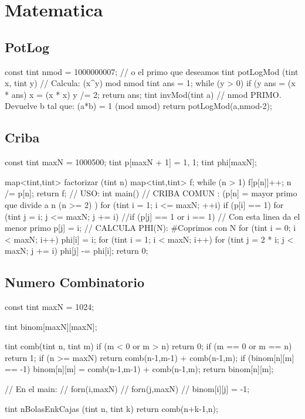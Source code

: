 \section{Matematica}

\subsection{PotLog}
\begin{code}
const tint nmod = 1000000007; // o el primo que deseamos
tint potLogMod (tint x, tint y) // Calcula: (x^y) mod nmod
{
	tint ans = 1;
	while (y > 0)
	{
		if (y %
			ans = (x * ans) %
		x = (x * x) %
		y /= 2;
	}
	return ans;
}
tint invMod(tint a) // nmod PRIMO. Devuelve b tal que: (a*b) = 1 (mod nmod) 
{
	return potLogMod(a,nmod-2);
}
\end{code}

\subsection{Criba}
\begin{code}
const tint maxN = 1000500;
tint p[maxN + 1] = {1, 1};
tint phi[maxN]; 

map<tint,tint> factorizar (tint n)
{
	map<tint,tint> f;
	while (n > 1) 
	{ 
		f[p[n]]++;
		n /= p[n]; 
	}
	return f;
}
// USO:
int main()
{
	// CRIBA COMUN : (p[n] = mayor primo que divide a n (n >= 2) )
	for (tint i = 1; i <= maxN; ++i)
		if (p[i] == 1)
			for (tint j = i; j <= maxN; j += i)
				//if (p[j] == 1 or i == 1) // Con esta linea da el menor primo
				p[j] = i;
	// CALCULA PHI(N): #Coprimos con N
	for (tint i = 0; i < maxN; i++) 
		phi[i] = i;	
	for (tint i = 1; i < maxN; i++)
	for (tint j = 2 * i; j < maxN; j += i)
		phi[j] -= phi[i];
	return 0;
}
\end{code}

\subsection{Numero Combinatorio}

\begin{code}
const tint maxN = 1024;

tint binom[maxN][maxN];

tint comb(tint n, tint m)
{
	if (m < 0 or m > n)
	return 0;
	if (m == 0 or m == n)
	return 1;
	if (n >= maxN)
	return comb(n-1,m-1) + comb(n-1,m);
	if (binom[n][m] == -1)
	binom[n][m] = comb(n-1,m-1) + comb(n-1,m);
	return binom[n][m];
}

// En el main:
//	forn(i,maxN)
//	forn(j,maxN)
//		binom[i][j] = -1;

tint nBolasEnkCajas (tint n, tint k)
{
	return comb(n+k-1,n);
}

\end{code}


